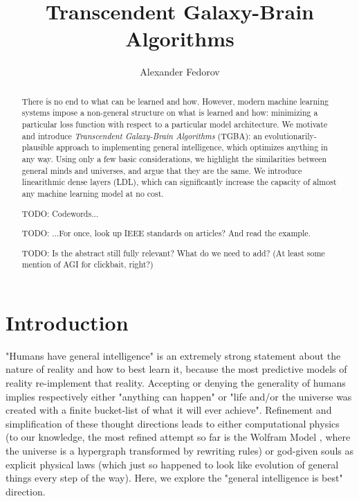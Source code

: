\documentclass{article}
\begin{document}
\title{Transcendent Galaxy-Brain Algorithms}
\author{Alexander Fedorov}
\date{}

\maketitle

\begin{abstract}

There is no end to what can be learned and how. However, modern machine learning systems impose a non-general structure on what is learned and how: minimizing a particular loss function with respect to a particular model architecture. We motivate and introduce \textit{Transcendent Galaxy-Brain Algorithms} (TGBA): an evolutionarily-plausible approach to implementing general intelligence, which optimizes anything in any way. Using only a few basic considerations, we highlight the similarities between general minds and universes, and argue that they are the same. We introduce linearithmic dense layers (LDL), which can significantly increase the capacity of almost any machine learning model at no cost.

    TODO: Codewords...

    TODO: ...For once, look up IEEE standards on articles? And read the example.

    TODO: Is the abstract still fully relevant? What do we need to add? (At least some mention of AGI for clickbait, right?)

\end{abstract}

\section{Introduction}

"Humans have general intelligence" is an extremely strong statement about the nature of reality and how to best learn it, because the most predictive models of reality re-implement that reality. Accepting or denying the generality of humans implies respectively either "anything can happen" or "life and/or the universe was created with a finite bucket-list of what it will ever achieve". Refinement and simplification of these thought directions leads to either computational physics (to our knowledge, the most refined attempt so far is the Wolfram Model \cite{Wolfram_2020}, where the universe is a hypergraph transformed by rewriting rules) or god-given souls as explicit physical laws (which just so happened to look like evolution of general things every step of the way). Here, we explore the "general intelligence is best" direction.
\end{document}
